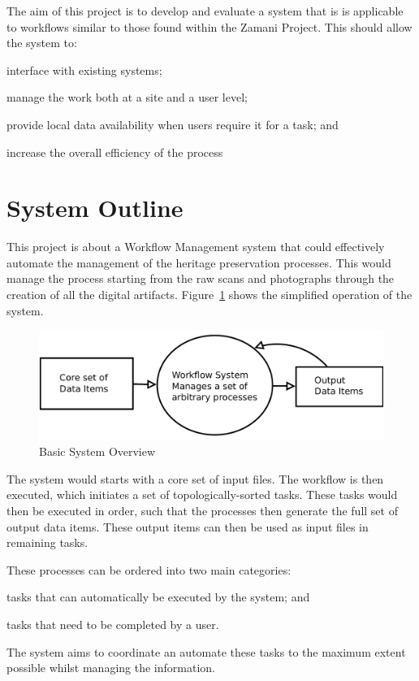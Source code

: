     The aim of this project is to develop and evaluate a system that is is applicable
    to workflows similar to those found within the Zamani Project. This should allow the
    system to: \begin{inparaenum}[i)] \item interface with existing systems; \item manage the
    work both at a site and a user level; \item provide local data availability when users
    require it for a task; and \item increase the overall efficiency of the process
    \end{inparaenum}

\section{System Outline}
    This project is about a Workflow Management system that could effectively
    automate the management of the heritage preservation processes.
	This would manage the process starting from the raw scans and photographs
	through the creation of all the digital artifacts. Figure~\ref{intro:basic}
	shows the simplified operation of the system.
	\begin{figure}[!h]
		\begin{center}
			\includegraphics[scale=0.34]{figures/basic_system.pdf}
		\end{center}
		\caption{Basic System Overview}
		\label{intro:basic}
	\end{figure}

	\noindent The system would starts with a
	core set of input files. The workflow is then executed, which initiates a set
	of topologically-sorted tasks. These tasks would then be executed in order, such that
    the processes then generate the full set of output data items. These output items can then
    be used as input files in remaining tasks.

    These processes can be ordered into two main categories:
    \begin{inparaenum}[(i)]
        \item tasks that can automatically be executed by the system; and 
        \item tasks that need to be completed by a user.
    \end{inparaenum} The system aims to coordinate an automate these tasks to
    the maximum extent possible whilst managing the information.

